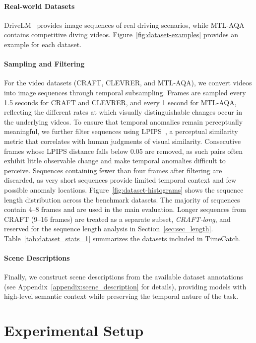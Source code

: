 \documentclass[11pt]{article}
\begin{document}
\paragraph{Real-world Datasets} DriveLM~\cite{sima2024drivelm} provides image sequences of real driving scenarios, while MTL-AQA~\cite{parmar2019and} contains competitive diving videos. Figure~\ref{fig:dataset-examples} provides an example for each dataset.

\paragraph{Sampling and Filtering}
For the video datasets (CRAFT, CLEVRER, and MTL-AQA), we convert videos into image sequences through temporal subsampling. Frames are sampled every 1.5 seconds for CRAFT and CLEVRER, and every 1 second for MTL-AQA, reflecting the different rates at which visually distinguishable changes occur in the underlying videos.
To ensure that temporal anomalies remain perceptually meaningful, we further filter sequences using LPIPS~\cite{zhang2018unreasonable}, a perceptual similarity metric that correlates with human judgments of visual similarity. Consecutive frames whose LPIPS distance falls below 0.05 are removed, as such pairs often exhibit little observable change and make temporal anomalies difficult to perceive. Sequences containing fewer than four frames after filtering are discarded, as very short sequences provide limited temporal context and few possible anomaly locations. Figure~\ref{fig:dataset-histograms} shows the sequence length distribution across the benchmark datasets. The majority of sequences contain 4--8 frames and are used in the main evaluation. Longer sequences from CRAFT (9--16 frames) are treated as a separate subset, \textit{CRAFT-long}, and reserved for the sequence length analysis in Section~\ref{sec:sec_length}. Table~\ref{tab:dataset_stats_1} summarizes the datasets included in TimeCatch.


\paragraph{Scene Descriptions} Finally, we construct scene descriptions from the available dataset annotations (see Appendix~\ref{appendix:scene_description} for details), providing models with high-level semantic context while preserving the temporal nature of the task.

\section{Experimental Setup}
\end{document}
